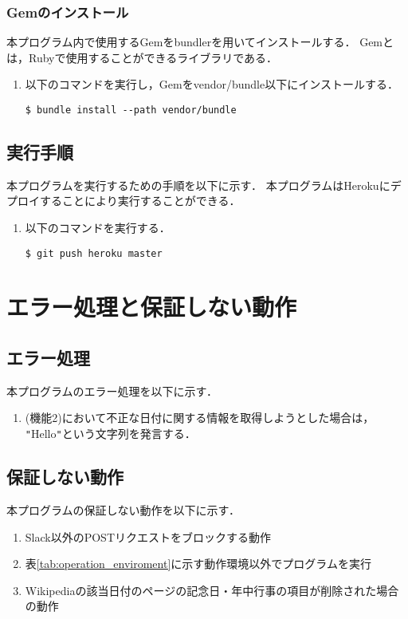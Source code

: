 \documentclass[fleqn, 14pt]{extarticlej}
\begin{document}
\subsubsection{Gemのインストール}
本プログラム内で使用するGemをbundlerを用いてインストールする．
Gemとは，Rubyで使用することができるライブラリである．
\begin{enumerate}
\item 以下のコマンドを実行し，Gemをvendor/bundle以下にインストールする．
\begin{verbatim}
$ bundle install --path vendor/bundle
\end{verbatim}
\end{enumerate}

\subsection{実行手順}
\label{sub:process}
本プログラムを実行するための手順を以下に示す．
本プログラムはHerokuにデプロイすることにより実行することができる．
\begin{enumerate}
\item 以下のコマンドを実行する．
\begin{verbatim}
$ git push heroku master
\end{verbatim}
\end{enumerate}

\section{エラー処理と保証しない動作}
\label{sec:error_handling}
\subsection{エラー処理}
\label{sub:error_handling}
本プログラムのエラー処理を以下に示す．
\begin{enumerate}
\item %
  (機能2)において不正な日付に関する情報を取得しようとした場合は，
  \verb|"|Hello\verb|"|という文字列を発言する．

\end{enumerate}
\subsection{保証しない動作}
本プログラムの保証しない動作を以下に示す．
\begin{enumerate}
\item Slack以外のPOSTリクエストをブロックする動作
\item 表\ref{tab:operation_enviroment}に示す動作環境以外でプログラムを実行
\item Wikipediaの該当日付のページの記念日・年中行事の項目が削除された場合の動作
\end{enumerate}



\end{document}

